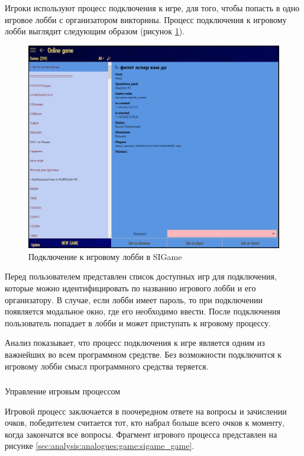 Игроки используют процесс подключения к игре, для того, чтобы попасть в одно игровое лобби с организатором викторины.
Процесс подключения к игровому лобби выглядит следующим образом (рисунок \ref{sec:analysis:analogues:join_game:sigame_join}).

\begin{figure}[!ht]
	\centering
	\includegraphics[scale=0.4]{attachments/sigame_join.png}  
	\caption{Подключение к игровому лобби в SIGame}
	\label{sec:analysis:analogues:join_game:sigame_join}
\end{figure}

Перед пользователем представлен список доступных игр для подключения, которые можно идентифицировать по названию игрового лобби и его организатору.
В случае, если лобби имеет пароль, то при подключении появляется модальное окно, где его необходимо ввести. После подключения пользователь попадает в лобби и 
может приступать к игровому процессу.

Анализ показывает, что процесс подключения к игре является одним из важнейших во всем программном средстве. Без возможности подключится к игровому лобби смысл
программного средства теряется.

\subsubsection{} Управление игровым процессом
\label{sec:analysis:analogues:game}

Игровой процесс заключается в поочередном ответе на вопросы и зачислении очков, победителем считается тот, кто набрал больше всего очков к моменту, когда закончатся все вопросы.
Фрагмент игрового процесса представлен на рисунке \ref{sec:analysis:analogues:game:sigame_game}.

